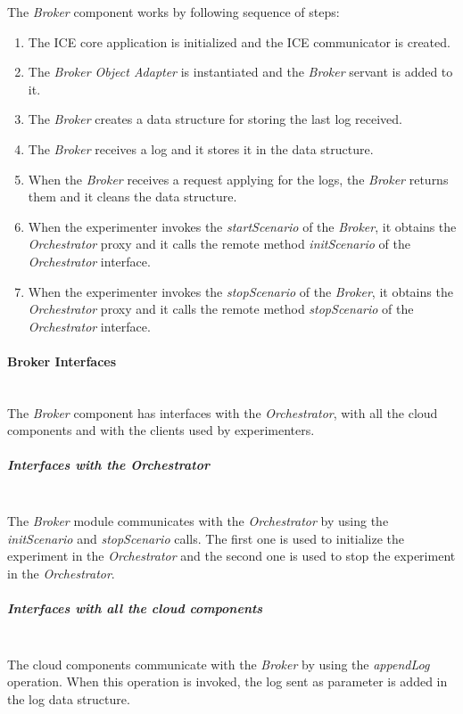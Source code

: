 The \emph{Broker} component works by following  sequence of steps:
\begin{enumerate}
\item The ICE core application is initialized and the ICE communicator is
  created.
\item The \emph{Broker Object Adapter} is instantiated and the \emph{Broker} servant is
  added to it.
\item The  \emph{Broker} creates a data structure for storing the last log
  received.
\item The \emph{Broker} receives a log and it stores it in the data structure.
\item When the \emph{Broker} receives a request applying for the logs, the
  \emph{Broker} returns them and it cleans the data structure.
\item When the experimenter invokes the \emph{startScenario} of the \emph{Broker}, it
  obtains the \emph{Orchestrator} proxy and it calls the remote method
  \emph{initScenario} of the \emph{Orchestrator} interface.
\item When the experimenter invokes the \emph{stopScenario} of the \emph{Broker}, it
  obtains the \emph{Orchestrator} proxy and it calls the remote method
  \emph{stopScenario} of the \emph{Orchestrator} interface.
\end{enumerate}

\paragraph{Broker Interfaces}~\\

The \emph{Broker} component has interfaces with the \emph{Orchestrator}, with
all the cloud components and with the clients used by experimenters.

\subparagraph{Interfaces with the Orchestrator}~\\

The \emph{Broker} module communicates with the \emph{Orchestrator} by using the
\emph{initScenario} and \emph{stopScenario} calls. The first one is used to
initialize the experiment in the \emph{Orchestrator} and the second one is used
to stop the experiment in the \emph{Orchestrator}.

\subparagraph{Interfaces with all the cloud components}~\\

The cloud components communicate with the \emph{Broker} by using the
\emph{appendLog} operation. When this operation is invoked, the log sent as parameter is added in the log data structure.  

